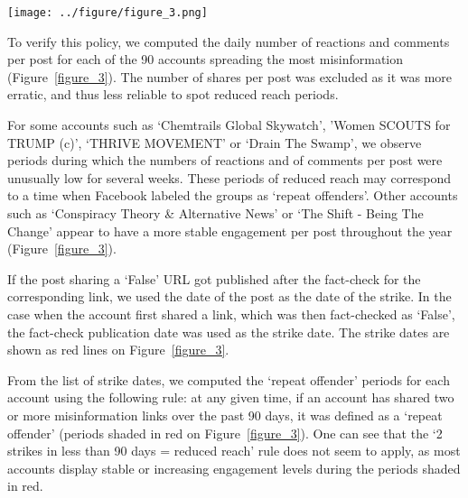 \documentclass[sigconf]{acmart}
\begin{document}
\begin{figure*}[p]
  \centering
  \texttt{[image: ../figure/figure\_3.png]}
  \caption{Mean number of reactions and comments per post over the past year for 10 Facebook accounts among the 90 spreading misinformation repeatedly. Each red line at the bottom of a subplot represents the date of a known strike (a shared link labelled `False' by Science Feedback), and the areas shaded in red represent the `repeat offender' periods as defined by the `2 strikes in less than 90 days' rule. The areas shaded in green represent the `reduced reach' periods automatically defined by a combination of a `one standard deviation below the average' rule and a period average below a reference average.}
  \label{figure_3}
\end{figure*}

To verify this policy, we computed the daily number of reactions and comments per post for each of the 90 accounts spreading the most misinformation (Figure~\ref{figure_3}). The number of shares per post was excluded as it was more erratic, and thus less reliable to spot reduced reach periods.

For some accounts such as `Chemtrails Global Skywatch', 'Women SCOUTS for TRUMP (c)', `THRIVE MOVEMENT' or `Drain The Swamp', we observe periods during which the numbers of reactions and of comments per post were unusually low for several weeks. These periods of reduced reach may correspond to a time when Facebook labeled the groups as `repeat offenders'. Other accounts such as `Conspiracy Theory \& Alternative News' or `The Shift - Being The Change' appear to have a more stable engagement per post throughout the year (Figure~\ref{figure_3}).

If the post sharing a `False' URL got published after the fact-check for the corresponding link, we used the date of the post as the date of the strike. In the case when the account first shared a link, which was then fact-checked as `False', the fact-check publication date was used as the strike date. The strike dates are shown as red lines on Figure~\ref{figure_3}.

From the list of strike dates, we computed the `repeat offender' periods for each account using the following rule: at any given time, if an account has shared two or more misinformation links over the past 90 days, it was defined as a `repeat offender' (periods shaded in red on Figure~\ref{figure_3}). One can see that the `2 strikes in less than 90 days = reduced reach' rule does not seem to apply, as most accounts display stable or increasing engagement levels during the periods shaded in red. 
\end{document}
